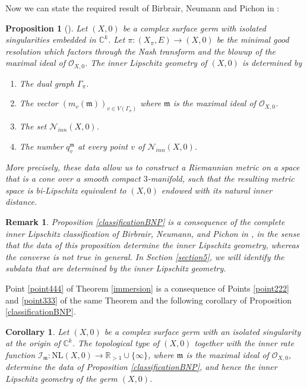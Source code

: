 \documentclass[reqno,dvipsnames,12pt]{amsart}
\newtheorem{prop}[thm]{Proposition}
\newtheorem{coro}[thm]{Corollary}
\newtheorem{rema}[thm]{Remark}
\begin{document}
Now we can state the required result of Birbrair, Neumann and Pichon in \cite{BNP}:
\begin{prop}[{\cite[Theorem 7.5.30]{pichonintroduction}}\label{classificationBNP}]	Let $(X,0)$ be a complex surface germ with isolated singularities embedded in $\mathbb{C}^k$. Let $ \pi:(X_{\pi},E) \longrightarrow (X,0)$ be the minimal good resolution which factors through the Nash transform and the blowup of the maximal ideal of $\mathcal{O}_{X,0}$. The inner Lipschitz geometry of $(X,0)$  is determined by
\begin{enumerate}
	\item The dual graph $\Gamma_{\pi}$.
	\item The vector $(m_v(\mathfrak{m}))_{v \in V(\Gamma_{\pi})}$ where $\mathfrak{m}$ is the maximal ideal of $\mathcal{O}_{X,0}$.
	\item The set $\mathcal{N}_{inn}(X,0)$.
	\item The number $q_v^{\mathfrak{m}}$ at every point $v$ of 	$\mathcal{N}_{inn}(X,0)$.	\end{enumerate}

  More precisely, these data allow us to construct a Riemannian metric on a space that is a cone over a smooth compact \(3\)-manifold, such that the resulting metric space is bi-Lipschitz equivalent to \((X,0)\) endowed with its natural inner distance.

\end{prop}
\begin{rema}
Proposition \ref{classificationBNP} is a consequence of the complete inner Lipschitz classification of Birbrair, Neumann, and Pichon in \cite{BNP}, in the sense that the data of this proposition determine the inner Lipschitz geometry, whereas the converse is not true in general. In Section \ref{section5}, we will identify the subdata that are determined by the inner Lipschitz geometry.
\end{rema}
Point \ref{point444} of Theorem \ref{immersion} is  a consequence of Points \ref{point222} and \ref{point333} of the same Theorem and the  following corollary of Proposition \ref{classificationBNP}.

\begin{coro}\label{classificationBNPcoro}
Let $(X,0)$ be a complex surface germ with an isolated singularity at the origin of $\mathbb{C}^k$. The topological type of $(X,0)$ together with the inner rate function $\mathcal{I}_{\mathfrak{m}}:\mathrm{NL}(X,0) \to \mathbb{R}_{>1} \cup \{\infty\}$, where $\mathfrak{m}$ is the maximal ideal of $\mathcal{O}_{X,0}$, determine the data of Proposition \ref{classificationBNP}, and hence the inner Lipschitz geometry of the germ $(X,0)$.
\end{coro}
\end{document}
